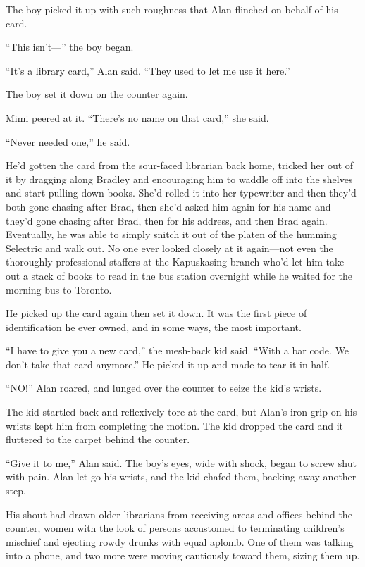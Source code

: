 The boy picked it up with such roughness that Alan flinched on behalf
of his card.

``This isn't---'' the boy began.

``It's a library card,'' Alan said.  ``They used to let me use it
here.''

The boy set it down on the counter again.

Mimi peered at it.  ``There's no name on that card,'' she said.

``Never needed one,'' he said.

He'd gotten the card from the sour-faced librarian back home, tricked
her out of it by dragging along Bradley and encouraging him to waddle
off into the shelves and start pulling down books.  She'd rolled it
into her typewriter and then they'd both gone chasing after Brad, then
she'd asked him again for his name and they'd gone chasing after Brad,
then for his address, and then Brad again.  Eventually, he was able to
simply snitch it out of the platen of the humming Selectric and walk
out.  No one ever looked closely at it again---not even the thoroughly
professional staffers at the Kapuskasing branch who'd let him take out
a stack of books to read in the bus station overnight while he waited
for the morning bus to Toronto.

He picked up the card again then set it down.  It was the first piece
of identification he ever owned, and in some ways, the most important.

``I have to give you a new card,'' the mesh-back kid said.  ``With a
bar code.  We don't take that card anymore.'' He picked it up and made
to tear it in half.

``NO!'' Alan roared, and lunged over the counter to seize the kid's
wrists.

The kid startled back and reflexively tore at the card, but Alan's
iron grip on his wrists kept him from completing the motion.  The kid
dropped the card and it fluttered to the carpet behind the counter.

``Give it to me,'' Alan said.  The boy's eyes, wide with shock, began
to screw shut with pain.  Alan let go his wrists, and the kid chafed
them, backing away another step.

His shout had drawn older librarians from receiving areas and offices
behind the counter, women with the look of persons accustomed to
terminating children's mischief and ejecting rowdy drunks with equal
aplomb.  One of them was talking into a phone, and two more were
moving cautiously toward them, sizing them up.

